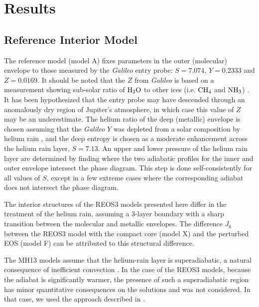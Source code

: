 \section{Results} \label{sec:results}

\subsection{Reference Interior Model}

The reference model (model A) fixes parameters in the outer (molecular) envelope to those
measured by the \textit{Galileo} entry probe: $S=7.074$, $Y=0.2333$ and $Z=0.0169$.
It should be noted that the $Z$ from \textit{Galileo} is based on a measurement
showing sub-solar ratio of ${\rm H}_2{\rm O}$ to other ices (i.e. ${\rm CH}_4$ and
${\rm NH}_3$) \citep{Wong2004}. It has been hypothesized that the entry probe may
have descended through an anomalously dry region of Jupiter's atmosphere, in which
case this value of $Z$ may be an underestimate. The helium ratio of the deep
(metallic) envelope is chosen assuming that the \textit{Galileo} $Y$ was depleted
from a solar composition by helium rain , and the deep entropy is chosen as a
moderate enhancement across the helium rain layer, $S=7.13$.  An upper and lower
pressure of the helium rain layer are determined by finding where the two adiabatic
profiles for the inner and outer envelope intersect the \citep{morales2013} phase
diagram. This step is done self-consistently for all values of $S$, except in a few
extreme cases where the corresponding adiabat does not intersect the phase diagram. 

The interior structures of the REOS3 models presented here differ in the treatment of
the helium rain, assuming a 3-layer boundary with a sharp transition between the
molecular and metallic envelopes. The difference $J_6$ between the REOS3 model with
the compact core (model X) and the perturbed EOS (model F) can be attributed to this
structural difference. 

The MH13 models assume that the helium-rain layer is
superadiabatic, a natural consequence of inefficient convection
\citep{militzer2016}. In the case of the REOS3 models, because the adiabat is
significantly warmer, the presence of such a superadiabatic region has minor
quantitative consequences on the solutions and was not considered. In that
case, we used the approach described in \citet{miguel2016}.  

